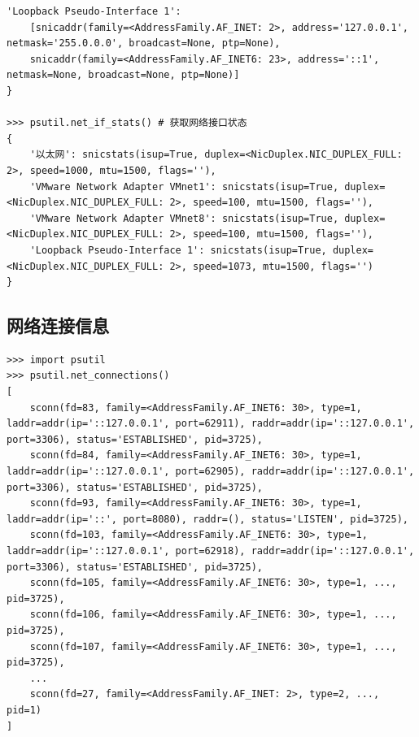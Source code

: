 \begin{lstlisting}[style=demostyle,numbers=none]
'Loopback Pseudo-Interface 1': 
    [snicaddr(family=<AddressFamily.AF_INET: 2>, address='127.0.0.1', netmask='255.0.0.0', broadcast=None, ptp=None), 
    snicaddr(family=<AddressFamily.AF_INET6: 23>, address='::1', netmask=None, broadcast=None, ptp=None)]
}

>>> psutil.net_if_stats() # 获取网络接口状态
{
    '以太网': snicstats(isup=True, duplex=<NicDuplex.NIC_DUPLEX_FULL: 2>, speed=1000, mtu=1500, flags=''), 
    'VMware Network Adapter VMnet1': snicstats(isup=True, duplex=<NicDuplex.NIC_DUPLEX_FULL: 2>, speed=100, mtu=1500, flags=''), 
    'VMware Network Adapter VMnet8': snicstats(isup=True, duplex=<NicDuplex.NIC_DUPLEX_FULL: 2>, speed=100, mtu=1500, flags=''), 
    'Loopback Pseudo-Interface 1': snicstats(isup=True, duplex=<NicDuplex.NIC_DUPLEX_FULL: 2>, speed=1073, mtu=1500, flags='')
}
\end{lstlisting}

\subsection{网络连接信息}
\begin{lstlisting}[style=demostyle,numbers=none]
>>> import psutil
>>> psutil.net_connections()
[
    sconn(fd=83, family=<AddressFamily.AF_INET6: 30>, type=1, laddr=addr(ip='::127.0.0.1', port=62911), raddr=addr(ip='::127.0.0.1', port=3306), status='ESTABLISHED', pid=3725),
    sconn(fd=84, family=<AddressFamily.AF_INET6: 30>, type=1, laddr=addr(ip='::127.0.0.1', port=62905), raddr=addr(ip='::127.0.0.1', port=3306), status='ESTABLISHED', pid=3725),
    sconn(fd=93, family=<AddressFamily.AF_INET6: 30>, type=1, laddr=addr(ip='::', port=8080), raddr=(), status='LISTEN', pid=3725),
    sconn(fd=103, family=<AddressFamily.AF_INET6: 30>, type=1, laddr=addr(ip='::127.0.0.1', port=62918), raddr=addr(ip='::127.0.0.1', port=3306), status='ESTABLISHED', pid=3725),
    sconn(fd=105, family=<AddressFamily.AF_INET6: 30>, type=1, ..., pid=3725),
    sconn(fd=106, family=<AddressFamily.AF_INET6: 30>, type=1, ..., pid=3725),
    sconn(fd=107, family=<AddressFamily.AF_INET6: 30>, type=1, ..., pid=3725),
    ...
    sconn(fd=27, family=<AddressFamily.AF_INET: 2>, type=2, ..., pid=1)
]
\end{lstlisting}
